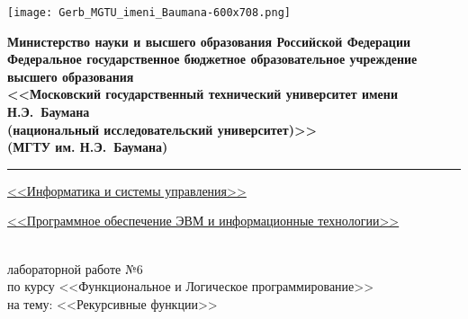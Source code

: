 \clearpage

\thispagestyle{fancy}
\renewcommand{\headrulewidth}{0pt}
\fancyhead{}

{
    \linespread{1}

    \noindent\begin{minipage}{0.12\textwidth}
        \texttt{[image: Gerb\_MGTU\_imeni\_Baumana-600x708.png]}
    \end{minipage}
    \hfill
    \noindent\begin{minipage}{0.83\textwidth}\centering
        \centering
        \small
        \bfseries
        Министерство науки и высшего образования Российской Федерации\\
        Федеральное государственное бюджетное образовательное учреждение высшего образования\\
        <<Московский государственный технический университет имени Н.Э.~Баумана\\
        (национальный исследовательский университет)>>\\
        (МГТУ им. Н.Э.~Баумана)
    \end{minipage}
}

\noindent\rule{\linewidth}{3pt}

{
\small
{} \uline{\hfill<<Информатика и системы управления>>\hfill}

 \uline{\hfill<<Программное обеспечение ЭВМ и информационные технологии>>\hfill}
}

\vspace{7\baselineskip}

\begin{center}
    {\Large{}} \\
    { лабораторной работе №6} \\
    по курсу <<Функциональное и Логическое программирование>> \\
    на тему: <<Рекурсивные функции>> \\
\end{center}

\vspace{6\baselineskip}

